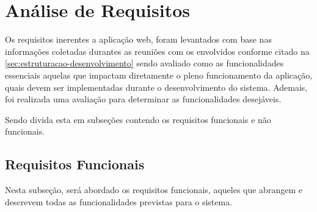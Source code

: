\section{Análise de Requisitos}
Os requisitos inerentes a aplicação web, foram levantados com base nas informações coletadas durantes as reuniões com os envolvidos conforme citado na \autoref{sec:estruturacao-desenvolvimento} sendo avaliado como as funcionalidades essenciais aquelas que impactam diretamente o pleno funcionamento da aplicação, quais devem ser implementadas durante o desenvolvimento do sistema. Ademais, foi realizada uma avaliação para determinar as funcionalidades desejáveis.

Sendo divida esta em subseções contendo os requisitos funcionais e não funcionais.

\subsection{Requisitos Funcionais}
Nesta subseção, será abordado os requisitos funcionais, aqueles que abrangem e descrevem todas as funcionalidades previstas para o sistema. 

